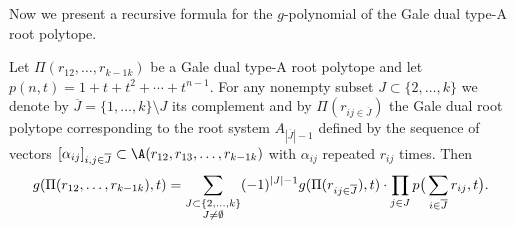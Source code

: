 Now we present a recursive formula for the $g$-polynomial of the Gale dual 
type-A root polytope.

\begin{theorem}\label{recgpoly}  Let $\Pi(r_{12}, \ldots ,r_{k-1 k})$ be a 
Gale dual type-A root polytope and let $p(n,t)=1+t+t^2+ \cdots +t^{n-1}$. For any 
nonempty subset $J\subset\{2, \ldots ,k\}$ we denote by 
$\overline{J}=\{1, \ldots ,k\}\setminus J$ its complement  and  by $\Pi(r_{ij\in 
\overline{J}})$ the Gale dual root polytope corresponding to the root system 
$A_{|\overline{J}|-1}$  defined by the sequence of vectors 
$[\alpha_{ij}]_{i,j\in\overline{J}} \subset \A(r_{12},r_{13}, \ldots ,r_{k-1 k})$ with 
$\alpha_{ij}$ repeated $r_{ij}$ times. Then
\begin{equation*}
g(\Pi(r_{12}, \ldots ,r_{k-1 k}), t) = \sum_{\substack{J\subset\{2, \ldots ,k\} \\ J\neq\emptyset}}  (-1)^{|J|-1}g(\Pi(r_{ij\in \overline{J}}),t)\cdot\prod_{j\in J}p\big{(}\sum_{i\in\overline{J}}r_{ij},t\big{)}.
\end{equation*}
\end{theorem}
